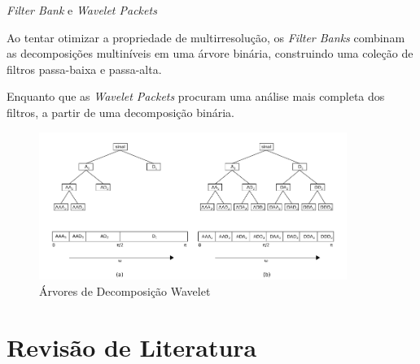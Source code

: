 \documentclass[10pt]{beamer}
\begin{document}
\begin{frame}{\textit{Filter Bank} e \textit{Wavelet Packets}}

   {
    Ao tentar otimizar a propriedade de multirresolução, os \textit{Filter Banks}
    combinam as decomposições multiníveis em uma árvore binária, construindo 
    uma coleção de filtros passa-baixa e passa-alta.

    Enquanto que as \textit{Wavelet Packets} procuram uma análise mais completa 
    dos filtros, a partir de uma decomposição binária.
  }

   {
    \begin{figure}[]
      \centering
      \includegraphics[width=10cm]{images/filterBankPacket.png}
      \caption{Árvores de Decomposição Wavelet}
    \end{figure}
  }

\end{frame}

\section{Revisão de Literatura}
\end{document}
